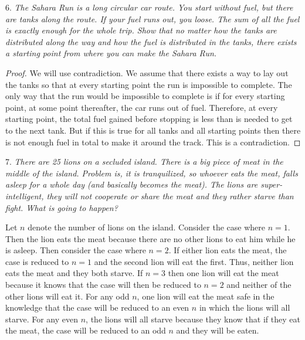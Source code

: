 \documentclass{article}
\begin{document}
\begin{flushleft}
6. \textsl{The Sahara Run is a long circular car route. You start without fuel, but there are tanks along the route. If your fuel runs out, you loose. The sum of all the fuel is exactly enough for the whole trip. Show that no matter how the tanks are distributed along the way and how the fuel is distributed in the tanks, there exists a starting point from where you can make the Sahara Run.}
\begin{proof}
We will use contradiction. We assume that there exists a way to lay out the tanks so that at every starting point the run is impossible to complete. The only way that the run would be impossible to complete is if for every starting point, at some point thereafter, the car runs out of fuel. Therefore, at every starting point, the total fuel gained before stopping is less than is needed to get to the next tank. But if this is true for all tanks and all starting points then there is not enough fuel in total to make it around the track. This is a contradiction.
\end{proof}

7. \textsl{There are 25 lions on a secluded island. There is a big piece of meat in the middle of the island. Problem is, it is tranquilized, so whoever eats the meat, falls asleep for a whole day (and basically becomes the meat). The lions are super-intelligent, they will not cooperate or share the meat and they rather starve than fight. What is going to happen?}\newline

Let $n$ denote the number of lions on the island. Consider the case where $n=1$. Then the lion eats the meat because there are no other lions to eat him while he is asleep. Then consider the case where $n=2$. If either lion eats the meat, the case is reduced to $n=1$ and the second lion will eat the first. Thus, neither lion eats the meat and they both starve. If $n=3$ then one lion will eat the meat because it knows that the case will then be reduced to $n=2$ and neither of the other lions will eat it. For any odd $n$, one lion will eat the meat safe in the knowledge that the case will be reduced to an even $n$ in which the lions will all starve. For any even $n$, the lions will all starve because they know that if they eat the meat, the case will be reduced to an odd $n$ and they will be eaten.



\end{flushleft}
\end{document}

